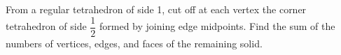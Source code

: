 From a regular tetrahedron of side 1, cut off at each vertex the corner tetrahedron of side $\dfrac{1}{2}$ formed by joining edge midpoints. Find the sum of the numbers of vertices, edges, and faces of the remaining solid.
